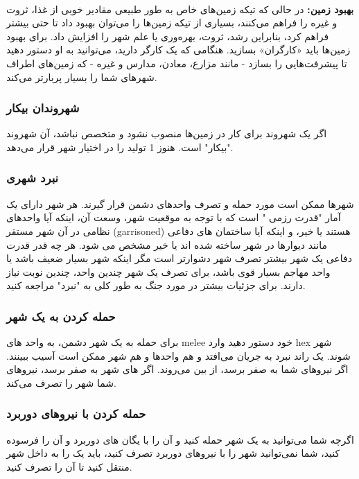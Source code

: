 \documentclass[]{article}
\begin{document}
\\\noindent \textbf{بهبود زمین:}
در حالی که تیکه­ زمین­‌های خاص به طور طبیعی مقادیر خوبی از غذا، ثروت و غیره را فراهم می‌کنند، بسیاری از تیکه­ زمین‌­ها را می‌توان بهبود داد تا حتی بیشتر فراهم کرد، بنابراین رشد، ثروت، بهره‌وری یا علم شهر را افزایش داد. برای بهبود زمین‌ها باید «کارگران» بسازید. هنگامی که یک کارگر دارید، می‌توانید به او دستور دهید تا پیشرفت‌هایی را بسازد - مانند مزارع، معادن، مدارس و غیره - که زمین‌های اطراف شهرهای شما را بسیار پربارتر می‌کند.
\subsubsection*{{\titr شهروندان بیکار}}
اگر یک شهروند برای کار در زمین‌­ها منصوب نشود و متخصص نباشد، آن شهروند "بیکار" است. هنوز 1 تولید را در اختیار شهر قرار می‌دهد.

\subsubsection*{{\titr نبرد شهری}}
شهرها ممکن است مورد حمله و تصرف واحدهای دشمن قرار گیرند. هر شهر دارای یک آمار "قدرت رزمی " است که با توجه به موقعیت شهر، وسعت آن، اینکه آیا واحدهای نظامی در آن شهر مستقر (garrisoned) هستند یا خیر، و اینکه آیا ساختمان های دفاعی مانند دیوارها در شهر ساخته شده اند یا خیر مشخص می شود. هر چه قدر قدرت دفاعی یک شهر بیشتر تصرف شهر دشوارتر است مگر اینکه شهر بسیار ضعیف باشد یا واحد مهاجم بسیار قوی باشد، برای تصرف یک شهر چندین واحد، چندین نوبت نیاز دارند. برای جزئیات بیشتر در مورد جنگ به طور کلی به "نبرد" مراجعه کنید.

\subsubsection*{{\titr حمله کردن به یک شهر}}
برای حمله به یک شهر دشمن، به واحد های melee خود دستور دهید وارد hex شهر شوند. یک راند نبرد به جریان می­‌افتد و هم واحد­ها و هم شهر ممکن است آسیب ببینند. اگر  نیرو­های شما به صفر برسد، از بین می‌روند. اگر  های شهر به صفر برسد، نیروهای شما شهر را تصرف می‌کند.

\subsubsection*{{\titr حمله کردن با نیروهای دوربرد}}
اگرچه شما می‌توانید به یک شهر حمله کنید و آن را با یگان های دوربرد و آن را فرسوده کنید، شما نمی‌توانید شهر را با نیروهای دوربرد تصرف کنید، باید یک  را به داخل شهر منتقل کنید تا آن را تصرف کنید.
\end{document}
